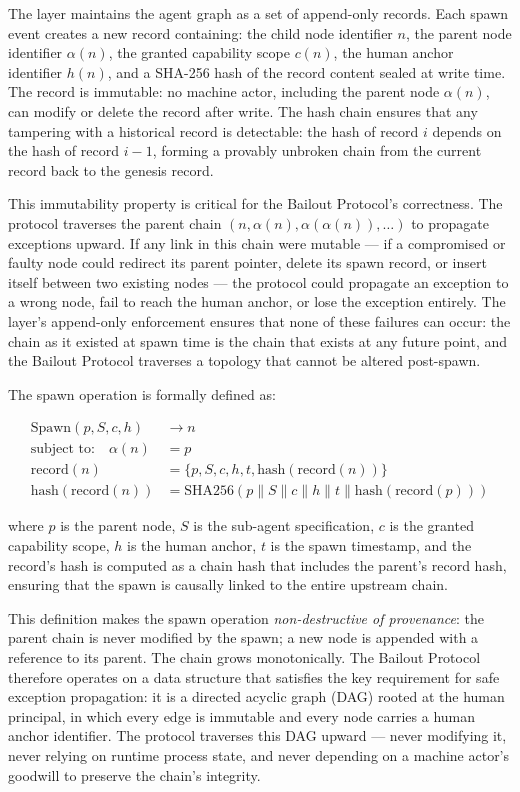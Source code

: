 The \fact{} layer maintains the agent graph as a set of append-only records. Each spawn event creates a new record containing: the child node identifier $n$, the parent node identifier $\alpha(n)$, the granted capability scope $c(n)$, the human anchor identifier $h(n)$, and a SHA-256 hash of the record content sealed at write time. The record is immutable: no machine actor, including the parent node $\alpha(n)$, can modify or delete the record after write. The hash chain ensures that any tampering with a historical record is detectable: the hash of record $i$ depends on the hash of record $i-1$, forming a provably unbroken chain from the current record back to the genesis record.

This immutability property is critical for the Bailout Protocol's correctness. The protocol traverses the parent chain $(n, \alpha(n), \alpha(\alpha(n)), \dots)$ to propagate exceptions upward. If any link in this chain were mutable — if a compromised or faulty node could redirect its parent pointer, delete its spawn record, or insert itself between two existing nodes — the protocol could propagate an exception to a wrong node, fail to reach the human anchor, or lose the exception entirely. The \fact{} layer's append-only enforcement ensures that none of these failures can occur: the chain as it existed at spawn time is the chain that exists at any future point, and the Bailout Protocol traverses a topology that cannot be altered post-spawn.

The \bxthree{} spawn operation is formally defined as:

\begin{align}
\text{Spawn}(p, S, c, h) &\rightarrow n \\
\text{subject to:} \quad \alpha(n) &= p \\
\text{record}(n) &= \{p, S, c, h, t, \text{hash}(\text{record}(n))\} \\
\text{hash}(\text{record}(n)) &= \text{SHA256}(p \parallel S \parallel c \parallel h \parallel t \parallel \text{hash}(\text{record}(p)))
\end{align}

where $p$ is the parent node, $S$ is the sub-agent specification, $c$ is the granted capability scope, $h$ is the human anchor, $t$ is the spawn timestamp, and the record's hash is computed as a chain hash that includes the parent's record hash, ensuring that the spawn is causally linked to the entire upstream chain.

This definition makes the spawn operation \emph{non-destructive of provenance}: the parent chain is never modified by the spawn; a new node is appended with a reference to its parent. The chain grows monotonically. The Bailout Protocol therefore operates on a data structure that satisfies the key requirement for safe exception propagation: it is a directed acyclic graph (DAG) rooted at the human principal, in which every edge is immutable and every node carries a human anchor identifier. The protocol traverses this DAG upward — never modifying it, never relying on runtime process state, and never depending on a machine actor's goodwill to preserve the chain's integrity.

